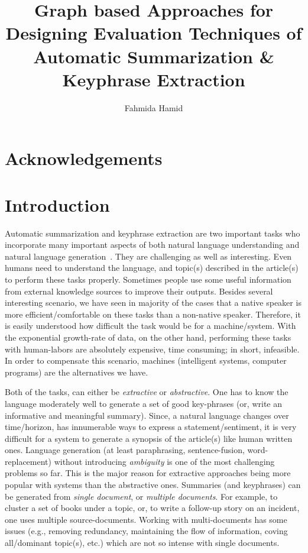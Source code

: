 \documentclass[a4paper]{report}
\begin{document}
\title{Graph based Approaches for Designing Evaluation Techniques of Automatic Summarization \& Keyphrase Extraction}
\author{Fahmida Hamid}
\date{}

\maketitle
{}
\tableofcontents
\listoffigures
\listoftables

\chapter*{Acknowledgements}
\begin{abstract}
\end{abstract}

\chapter{Introduction}
\label{intro}
Automatic summarization and keyphrase extraction are two important tasks who incorporate many important aspects of both natural language understanding and natural language generation~\cite{Radev:2003:ECL:1075096.1075144}. They are challenging as well as interesting. Even humans need to understand the language, and topic(s) described in the article(s) to perform these tasks properly. Sometimes people use some useful information from external knowledge sources to improve their outputs. Besides several interesting scenario, we have seen in majority of the cases that a native speaker is more efficient/comfortable on these tasks than a non-native speaker. Therefore, it is easily understood how difficult the task would be for a machine/system. With the exponential growth-rate of data, on the other hand, performing these tasks with human-labors are absolutely expensive, time consuming; in short, infeasible. In order to compensate this scenario, machines (intelligent systems, computer programs) are the alternatives we have.\\   
\par Both of the tasks, can either be \emph{extractive} or \emph{abstractive}. One has to know the language moderately well to  generate a set of good key-phrases (or, write an informative and meaningful summary). Since, a natural language changes over time/horizon, has innumerable ways to express a statement/sentiment, it is very difficult for a system to generate a synopsis of the article(s) like human written ones. Language generation (at least paraphrasing, sentence-fusion, word-replacement) without introducing \emph{ambiguity} is one of the most challenging problems so far. This is the major reason for extractive approaches being more popular with systems than the abstractive ones. Summaries (and keyphrases) can be generated from \emph{single document}, or \emph{multiple documents}. For example, to cluster a set of books under a topic, or, to write a follow-up story on an incident, one uses multiple source-documents. Working with multi-documents has some issues (e.g., removing redundancy, maintaining the flow of information, coving all/dominant topic(s), etc.) which are not so intense with single documents.\\ 
\end{document}

